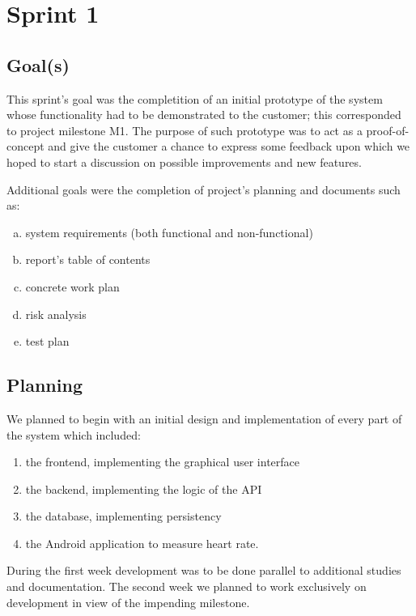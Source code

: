 

\chapter{Sprint 1}
\label{Sprint0}

\section{Goal(s)}

This sprint's goal was the completition of an initial prototype of the system whose functionality
had to be demonstrated to the customer; this corresponded to project milestone M1.
The purpose of such prototype was to act as a proof-of-concept and give the customer
a chance to express some feedback upon which we hoped to start a discussion
on possible improvements and new features.

Additional goals were the completion of project's planning and documents such as:
\begin{enumerate}[a)]
\item system requirements (both functional and non-functional)
\item report's table of contents
\item concrete work plan
\item risk analysis
\item test plan
\end{enumerate}

\section{Planning}

We planned to begin with an initial design and implementation of every part of the system which included:
\begin{enumerate}
\item the frontend, implementing the graphical user interface
\item the backend, implementing the logic of the API
\item the database, implementing persistency
\item the Android application to measure heart rate.
\end{enumerate}
During the first week development was to be done parallel to additional studies and documentation.
The second week we planned to work exclusively on development in view of the impending milestone.


